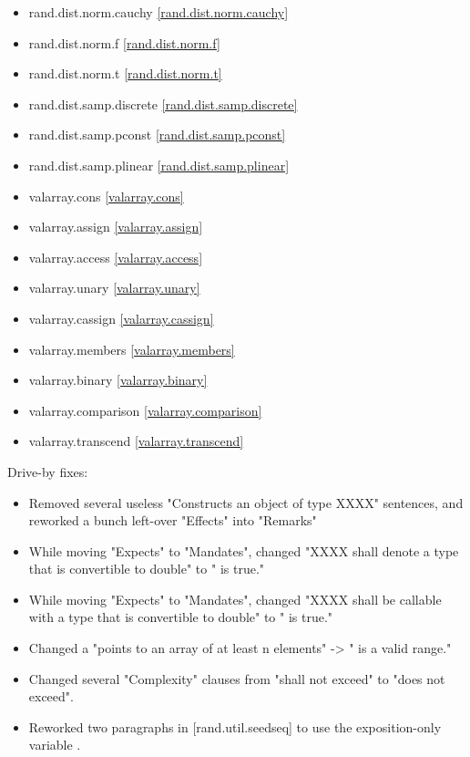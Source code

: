 \begin{multicols}{3}
\begin{itemize}
\item{rand.dist.norm.cauchy}	\ref{rand.dist.norm.cauchy}
\item{rand.dist.norm.f}			\ref{rand.dist.norm.f}
\item{rand.dist.norm.t}			\ref{rand.dist.norm.t}
\item{rand.dist.samp.discrete}	\ref{rand.dist.samp.discrete}
\item{rand.dist.samp.pconst}	\ref{rand.dist.samp.pconst}
\item{rand.dist.samp.plinear}	\ref{rand.dist.samp.plinear}
\item{valarray.cons}			\ref{valarray.cons}
\item{valarray.assign}			\ref{valarray.assign}
\item{valarray.access}			\ref{valarray.access}
\item{valarray.unary}			\ref{valarray.unary}
\item{valarray.cassign}			\ref{valarray.cassign}
\item{valarray.members}			\ref{valarray.members}
\item{valarray.binary}			\ref{valarray.binary}
\item{valarray.comparison}		\ref{valarray.comparison}
\item{valarray.transcend}		\ref{valarray.transcend}
\end{itemize}
\end{multicols}

Drive-by fixes:
\begin{itemize}
\item{Removed several useless "Constructs an object of type XXXX" sentences, and reworked a bunch left-over "Effects" into "Remarks"}
\item{While moving "Expects" to "Mandates", changed "XXXX shall denote a type that is convertible to double" to " is true."}
\item{While moving "Expects" to "Mandates", changed "XXXX shall be callable with a type that is convertible to double" to " is true."}
\item{Changed a "points to an array of at least n elements" -> " is a valid range."}
\item{Changed several "Complexity" clauses from "shall not exceed" to "does not exceed".}
\item{Reworked two paragraphs in [rand.util.seedseq] to use the exposition-only variable .}
\end{itemize}

